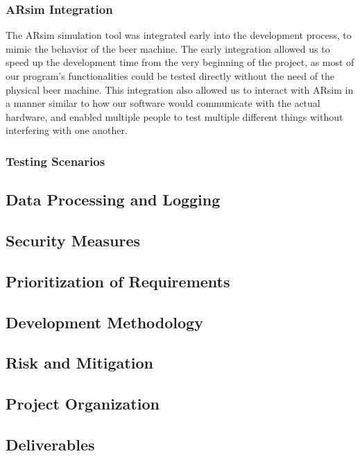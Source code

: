 \subsubsection{ARsim Integration}
The ARsim simulation tool was integrated early into the development process, to mimic the behavior of the beer machine.
The early integration allowed us to speed up the development time from the very beginning of the project, as most of our program's functionalities could be tested directly without the need of the physical beer machine.
This integration also allowed us to interact with ARsim in a manner similar to how our software would communicate with the actual hardware, and enabled multiple people to test multiple different things without interfering with one another. 

\subsubsection{Testing Scenarios}


\subsection{Data Processing and Logging}

\subsection{Security Measures}

\subsection{Prioritization of Requirements}

\subsection*{Development Methodology}

\subsection*{Risk and Mitigation}

\subsection{Project Organization}

\subsection{Deliverables}